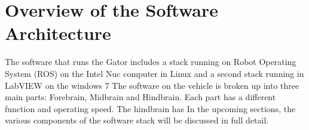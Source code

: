 \documentclass[12pt]{article}
\begin{document}
\renewcommand{\thefootnote}{\arabic{footnote}}



\tableofcontents

\newpage

\listoffigures

\newpage

\listoftables

\newpage

\newpage

\newpage

\newpage
%
\section{Overview of the Software Architecture}
The software that runs the Gator includes a stack running on Robot Operating System (ROS) on the Intel Nuc computer in Linux and a second stack running in LabVIEW on the windows 7 %
%
\noindent The software on the vehicle is broken up into three main parts: Forebrain, Midbrain and Hindbrain. Each part has a different function and operating speed. The hindbrain has %
%
In the upcoming sections, the various components of the software stack will be discussed in full detail.

\newpage

\newpage

\newpage

\newpage

\end{document}
